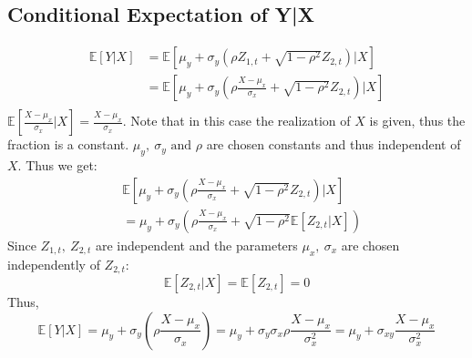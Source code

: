 \documentclass[11pt]{article}
\begin{document}
\subsection{Conditional Expectation of Y|X}
\label{sec:cond-expect}
\begin{equation}
  \label{eq:11}
  \begin{split}
    \mathbb{E}[Y|X] &= \mathbb{E}[\mu_y + \sigma_y (\rho Z_{1,t} + \sqrt{1-\rho^2} Z_{2,t})|X]\\
    &= \mathbb{E}[\mu_y + \sigma_y (\rho \frac{X-\mu_x}{\sigma_x} + \sqrt{1-\rho^2} Z_{2,t})|X]\\
  \end{split}
\end{equation}
$\mathbb{E}[\frac{X-\mu_x}{\sigma_x}|X] = \frac{X-\mu_x}{\sigma_x}$. Note that in this case the realization of $X$ is given, thus the fraction is a constant. $\mu_y,\ \sigma_y \text{ and } \rho$ are chosen constants and thus independent of $X$. Thus we get:
\begin{equation}
  \label{eq:12}
  \begin{split}
    &\mathbb{E}[\mu_y + \sigma_y (\rho \frac{X-\mu_x}{\sigma_x} + \sqrt{1-\rho^2} Z_{2,t})|X]\\
    & = \mu_y + \sigma_y (\rho \frac{X-\mu_x}{\sigma_x} + \sqrt{1-\rho^2} \mathbb{E} [Z_{2,t}|X])
  \end{split}
\end{equation}
Since $Z_{1,t},\ Z_{2,t}$ are independent and the parameters $\mu_x,\ \sigma_x$ are chosen independently of $Z_{2,t}$:
\begin{equation}
  \label{eq:13}
  \mathbb{E}[Z_{2,t}|X]= \mathbb{E}[Z_{2,t}] = 0
\end{equation}
Thus,
\begin{equation}
  \label{eq:15}
  \mathbb{E}[Y|X] = \mu_y + \sigma_y (\rho \frac{X-\mu_x}{\sigma_x}) = \mu_y + \sigma_y \sigma_x \rho \frac{X-\mu_x}{\sigma_x^2} = \mu_y + \sigma_{xy}\frac{X-\mu_x}{\sigma_x^2}
\end{equation}
\end{document}
